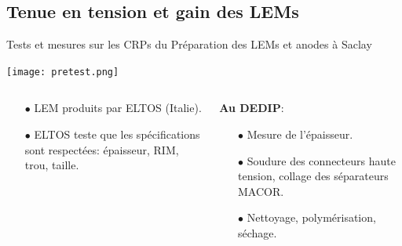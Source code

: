     \subsection[Tension et gain]{Tenue en tension et gain des LEMs}

    \begin{frame}{Tests et mesures sur les CRPs du \SSS{}}{Préparation des LEMs et anodes à Saclay}
    	\begin{scriptsize}
    		\begin{center}
		    	\texttt{[image: pretest.png]}
	    	\end{center}
	    	\begin{columns}
	    		\begin{column}{0.5\textwidth}
	    			\begin{itemize}
	    				\item[$\bullet$] LEM produits par ELTOS (Italie).
	    				\item[$\bullet$] ELTOS teste que les spécifications sont respectées: épaisseur, RIM, trou, taille.
	    			\end{itemize}
	    		\end{column}\hfill
	    		\begin{column}{0.5\textwidth}
	    			\textbf{Au DEDIP}:
	    			\begin{itemize}
	    				\item[$\bullet$] Mesure de l'épaisseur.
	    				\item[$\bullet$] Soudure des connecteurs haute tension, collage des séparateurs MACOR.
	    				\item[$\bullet$] Nettoyage, polymérisation, séchage.
	    			\end{itemize}
	    		\end{column}
	    	\end{columns}
	    \end{scriptsize} 
    \end{frame}

